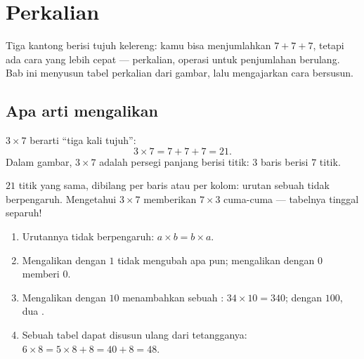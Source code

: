 \chapter{Perkalian}\label{ch:g3:mult}

Tiga kantong berisi tujuh kelereng: kamu bisa menjumlahkan
$7 + 7 + 7$, tetapi ada cara yang lebih cepat --- perkalian, operasi
untuk penjumlahan berulang. Bab ini menyusun tabel perkalian dari
gambar, lalu mengajarkan cara bersusun.

\section{Apa arti mengalikan}

\begin{definition}[Perkalian]\label{def:g3:mult:def}
 $3 \times 7$ berarti ``tiga kali tujuh'':
\[
3 \times 7 = 7 + 7 + 7 = 21 .
\]
Dalam gambar, $3 \times 7$ adalah persegi panjang berisi titik: $3$
baris berisi $7$ titik.
\end{definition}

\begin{omfigure}

{\small $21$ titik yang sama, dibilang per baris atau per kolom:
urutan sebuah  tidak berpengaruh. Mengetahui $3 \times 7$
memberikan $7 \times 3$ cuma-cuma --- tabelnya tinggal separuh!}
\end{omfigure}

\begin{proposition}[Aturan yang membantu]\label{prop:g3:mult:rules}
\begin{enumerate}
  \item Urutannya tidak berpengaruh: $a \times b = b \times a$.
  \item Mengalikan dengan $1$ tidak mengubah apa pun; mengalikan
        dengan $0$ memberi $0$.
  \item Mengalikan dengan $10$ menambahkan sebuah :
        $34 \times 10 = 340$; dengan $100$, dua .
  \item Sebuah tabel dapat disusun ulang dari tetangganya:
        $6 \times 8 = 5 \times 8 + 8 = 40 + 8 = 48$.
\end{enumerate}
\end{proposition}
\admitted

